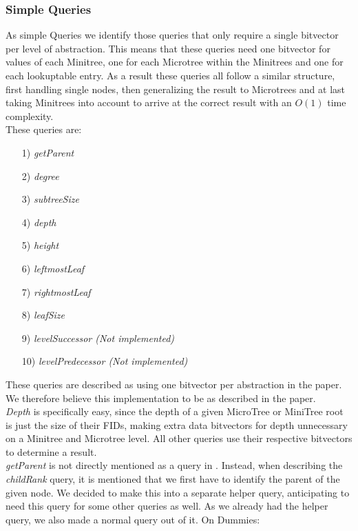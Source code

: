 \documentclass{article}
\begin{document}
\subsubsection{Simple Queries}
As simple Queries we identify those queries that only require a single bitvector per level of abstraction. This means that these queries need one bitvector for values of each Minitree, one for each Microtree within the Minitrees and one for each lookuptable entry.
As a result these queries all follow a similar structure, first handling single nodes, then generalizing the result to Microtrees and at last taking Minitrees into account to arrive at the correct result with an $O(1)$ time complexity.\\
These queries are:\\
\begin{itemize}
	\item[1)] \textit{getParent}
	\item[2)] \textit{degree}
	\item[3)] \textit{subtreeSize}
	\item[4)] \textit{depth}
	\item[5)] \textit{height}
	\item[6)] \textit{leftmostLeaf}
	\item[7)] \textit{rightmostLeaf}
	\item[8)] \textit{leafSize}
	\item[9)] \textit{levelSuccessor (Not implemented)}
	\item[10)] \textit{levelPredecessor (Not implemented)}
\end{itemize}
These queries are described as using one bitvector per abstraction in the paper. We therefore believe this implementation to be as described in the paper.\\
\textit{Depth} is specifically easy, since the depth of a given MicroTree or MiniTree root is just the size of their FIDs, making extra data bitvectors for depth unnecessary on a Minitree and Microtree level. All other queries use their respective bitvectors to determine a result.\\
\textit{getParent} is not directly mentioned as a query in \cite{farzanMunro}. Instead, when describing the \textit{childRank} query, it is mentioned that we first have to identify the parent of the given node. We decided to make this into a separate helper query, anticipating to need this query for some other queries as well. As we already had the helper query, we also made a normal query out of it.
On Dummies:\\
\end{document}
